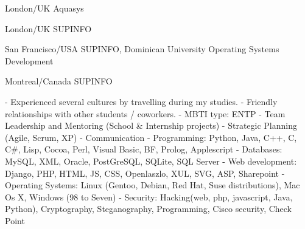 \documentclass[english]{ecv}
\begin{document}
\begin{ecv}
\ecvBSub{\ecvLanguageTravels}

 {London/UK}
                {Aquasys}

 {London/UK}
                {SUPINFO}

 {San Francisco/USA}
                {SUPINFO, Dominican University}
                {Operating Systems Development}

 {Montreal/Canada}
                {SUPINFO}

                { - Experienced several cultures by travelling during my
                  studies.\ecvNewLine
                  - Friendly relationships with other students / coworkers.\ecvNewLine
                  - MBTI type: ENTP\ecvNewLine
                }
                {- Team Leadership and Mentoring (School \& Internship projects)
                 - Strategic Planning (Agile, Scrum, XP)
                 - Communication
                }
                {- Programming: Python, Java, C++, C, C\#, Lisp, Cocoa, Perl,
                  Visual Basic, BF, Prolog, Applescript\ecvNewLine
                 - Databases: MySQL, XML, Oracle, PostGreSQL, SQLite, SQL
                 Server\ecvNewLine
                 - Web development: Django, PHP, HTML, JS, CSS, Openlaszlo, XUL,
                 SVG, ASP, Sharepoint\ecvNewLine
                 - Operating Systems: Linux (Gentoo, Debian, Red Hat, Suse
                 distributions), Mac Os X, Windows (98 to Seven)\ecvNewLine
                 - Security: Hacking(web, php, javascript, Java, Python),
                 Cryptography, Steganography, Programming, Cisco security, Check Point}


\end{ecv}
\end{document}
